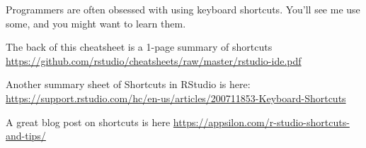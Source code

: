 \documentclass[
]{book}
\begin{document}
Programmers are often obsessed with using keyboard shortcuts. You'll see me use some, and you might want to learn them.

The back of this cheatsheet is a 1-page summary of shortcuts
\url{https://github.com/rstudio/cheatsheets/raw/master/rstudio-ide.pdf}

Another summary sheet of Shortcuts in RStudio is here:
\url{https://support.rstudio.com/hc/en-us/articles/200711853-Keyboard-Shortcuts}

A great blog post on shortcuts is here
\url{https://appsilon.com/r-studio-shortcuts-and-tips/}
\end{document}
